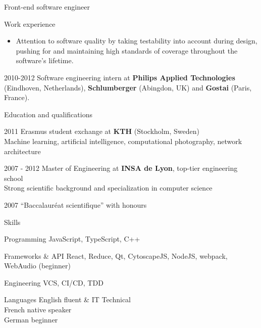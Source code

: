 \documentclass{article}
\begin{document}
\begin{cv}{Front-end software engineer}
\begin{cvlist}{Work experience}
\begin{itemize}
      \item Attention to software quality by taking testability into account during
      design, pushing for and maintaining high standards of coverage throughout
      the software's lifetime.
      \end{itemize}

    \item[2010-2012] Software engineering intern at \textbf{Philips Applied
      Technologies} (Eindhoven, Netherlands), \textbf{Schlumberger} (Abingdon, UK) and
      \textbf{Gostai} (Paris, France).




\end{cvlist}


\begin{cvlist}{Education and qualifications}
    \item[2011] Erasmus student exchange at \textbf{KTH} (Stockholm, Sweden)\\
    Machine learning, artificial intelligence, computational photography,
      network architecture

    \item[2007 - 2012] Master of Engineering at \textbf{INSA de Lyon}, top-tier
    engineering school\\
    Strong scientific background and specialization in computer science

    \item[2007] ``Baccalauréat scientifique'' with honours
\end{cvlist}


\begin{cvlist}{Skills}
    \item[Programming] JavaScript, TypeScript, C++
    \item[Frameworks \& API] React, Reduce, Qt, CytoscapeJS, NodeJS, webpack, WebAudio (beginner)
    \item[Engineering] VCS, CI/CD, TDD
    \item[Languages] English fluent \& IT Technical\\
      French native speaker\\
      German beginner
\end{cvlist}



\end{cv}
\end{document}
